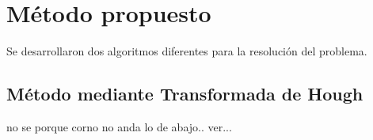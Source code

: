 \documentclass[conference,spanish,a4paper,10pt,oneside,final]{tfmpd}
\begin{document}
\section{Método propuesto}
Se desarrollaron dos algoritmos diferentes para la resolución del problema.
%
%
%
%
%
%
\subsection*{Método mediante Transformada de Hough}
no se porque corno no anda lo de abajo.. ver...
%
%
%
%
\end{document}
